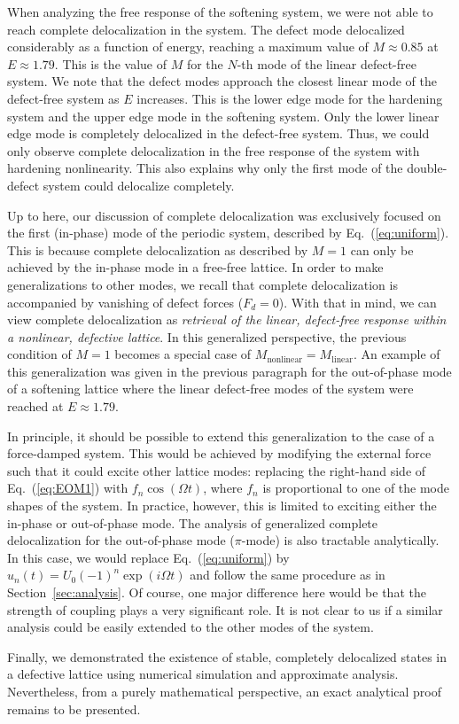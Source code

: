 \documentclass[aps,pre,twocolumn,groupedaddress]{revtex4-1}
\begin{document}
When analyzing the free response of the softening system, we were not able to reach complete delocalization in the system. The defect mode delocalized considerably as a function of energy, reaching a maximum value of $M \approx 0.85$ at $E \approx 1.79$. This is the value of $M$ for the $N$-th mode of the linear defect-free system. We note that the defect modes approach the closest linear mode of the defect-free system as $E$ increases. This is the lower edge mode for the hardening system and the upper edge mode in the softening system. Only the lower linear edge mode is completely delocalized in the defect-free system. Thus, we could only observe complete delocalization in the free response of the {\color{black}system with hardening nonlinearity}. This also explains why only the first mode of the double-defect system could delocalize completely. 


{\color{black}


Up to here, our discussion of complete delocalization was exclusively focused on the first (in-phase) mode of the periodic system, described by Eq.~(\ref{eq:uniform}). This is because complete delocalization as described by $M=1$ can only be achieved by the in-phase mode in a free-free lattice. In order to make generalizations to other modes, we recall that complete delocalization is accompanied by vanishing of defect forces ($F_d=0$). With that in mind, we can view complete delocalization as \emph{retrieval of the linear, defect-free response within a nonlinear, defective lattice}. In this generalized perspective, the previous condition of $M=1$ becomes a special case of $M_{\text{nonlinear}}=M_{\text{linear}}$. An example of this generalization was given in the previous paragraph for the out-of-phase mode of a softening lattice where the linear defect-free modes of the system were reached at $E \approx 1.79$. 

In principle, it should be possible to extend this generalization to the case of a force-damped system. This would be achieved by modifying the external force such that it could excite other lattice modes: replacing the right-hand side of Eq.~(\ref{eq:EOM1}) with $f_n\cos(\Omega t)$, where $f_n$ is proportional to one of the mode shapes of the system. In practice, however, this is limited to exciting either the in-phase or out-of-phase mode. The analysis of generalized complete delocalization for the out-of-phase mode ($\pi$-mode) is also tractable analytically. In this case, we would replace Eq.~(\ref{eq:uniform}) by $u_n(t)=U_0(-1)^n\exp(i\Omega t)$ and follow the same procedure as in Section~\ref{sec:analysis}. Of course, one major difference here would be that the strength of coupling plays a very significant role. It is not clear to us if a similar analysis could be easily extended to the other modes of the system. 

Finally, we demonstrated the existence of stable, completely delocalized states in a defective lattice using numerical simulation and approximate analysis. Nevertheless, from a purely mathematical perspective, an exact analytical proof remains to be presented. 

}
\end{document}
